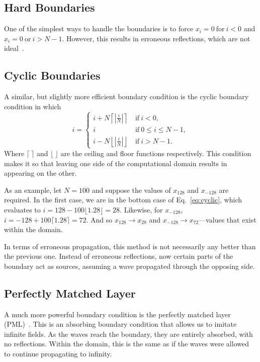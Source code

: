 \documentclass[12pt]{article}
\begin{document}
\begin{multicols}{2}
\subsection{Hard Boundaries}
One of the simplest ways to handle the boundaries is to force $x_i=0~\mathrm{for}~i<0$ and $x_i=0~\mathrm{or}~i>N-1$. However, this results in erroneous reflections, which are not ideal~\cite{Sullivan00}.
\subsection{Cyclic Boundaries}
A similar, but slightly more efficient boundary condition is the cyclic boundary condition in which
\begin{equation}
\label{eq:cyclic}
i=\begin{cases}
i+N\left\lceil\left|{\frac{i}{N}}\right|\right\rceil~&\mathrm{if}~i<0,\\
i~&\mathrm{if}~0\leq i\leq N-1,\\
i-N\left\lfloor\left|{\frac{i}{N}}\right|\right\rfloor~&\mathrm{if}~i>N-1.
\end{cases}
\end{equation}
Where $\lceil~\rceil$ and $\lfloor~\rfloor$ are the ceiling and floor functions respectively. This condition makes it so that leaving one side of the computational domain results in appearing on the other.

As an example, let $N=100$ and suppose the values of $x_{128}$ and $x_{-128}$ are required. In the first case, we are in the bottom case of Eq.~\ref{eq:cyclic}, which evaluates to $i=128-100\lfloor 1.28 \rfloor=28$. Likewise, for $x_{-128}$, $i=-128+100\lceil1.28\rceil=72$. And so $x_{128}\rightarrow x_{28}$ and $x_{-128}\rightarrow x_{72}$---values that exist within the domain.

In terms of erroneous propagation, this method is not necessarily any better than the previous one. Instead of erroneous reflections, now certain parts of the boundary act as sources, assuming a wave propagated through the opposing side.
\subsection{Perfectly Matched Layer}
A much more powerful boundary condition is the perfectly matched layer (PML)~\cite{Berenger94}. This is an absorbing boundary condition that allows us to imitate infinite fields. As the waves reach the boundary, they are entirely absorbed, with no reflections. Within the domain, this is the same as if the waves were allowed to continue propagating to infinity.


\end{multicols}
\end{document}

